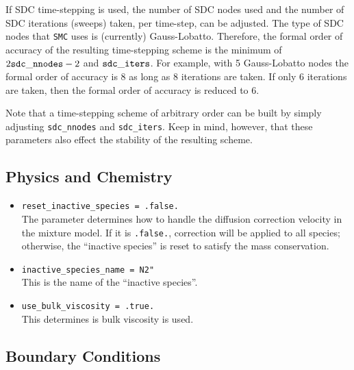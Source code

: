 \documentclass[11pt,letterpaper]{article}
\begin{document}
If SDC time-stepping is used, the number of SDC nodes used and the
number of SDC iterations (sweeps) taken, per time-step, can be
adjusted.  The type of SDC nodes that {\tt SMC} uses is (currently)
Gauss-Lobatto.  Therefore, the formal order of accuracy of the
resulting time-stepping scheme is the minimum of $2{\tt sdc\_nnodes} -
2$ and ${\tt sdc\_iters}$.  For example, with 5 Gauss-Lobatto
nodes the formal order of accuracy is 8 as long as 8 iterations are
taken.  If only 6 iterations are taken, then the formal order of
accuracy is reduced to 6.

Note that a time-stepping scheme of arbitrary order can be built by
simply adjusting {\tt sdc\_nnodes} and {\tt sdc\_iters}.  Keep in
mind, however, that these parameters also effect the stability of the
resulting scheme.

\subsection{Physics and Chemistry}
\begin{itemize}
\item {\tt reset\_inactive\_species = .false.}\\
  The parameter determines how to handle the diffusion correction
  velocity in the mixture model.  If it is {\tt .false.}, correction
  will be applied to all species; otherwise, the ``inactive species''
  is reset to satisfy the mass conservation.
\item {\tt inactive\_species\_name = N2"}\\
  This is the name of the ``inactive species''.
\item {\tt use\_bulk\_viscosity = .true.}\\
  This determines is bulk viscosity is used.
\end{itemize}


\subsection{Boundary Conditions}
\end{document}
